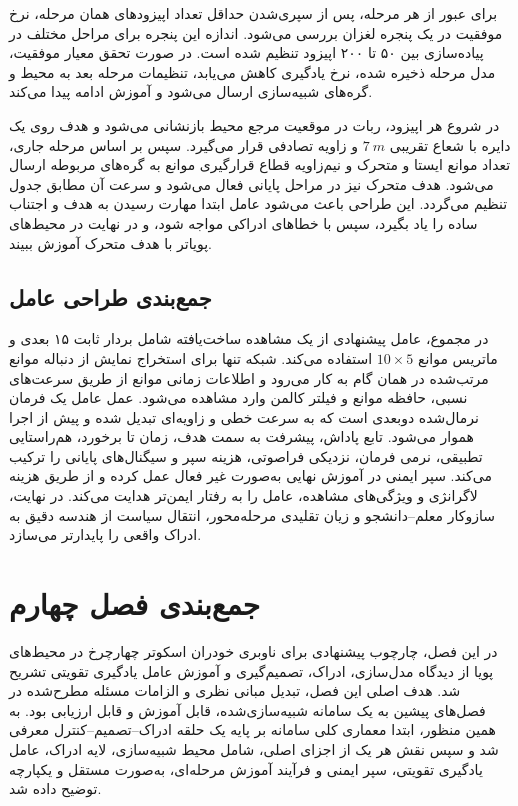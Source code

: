 برای عبور از هر مرحله، پس از سپری‌شدن حداقل تعداد اپیزودهای همان مرحله، نرخ موفقیت در یک پنجره لغزان بررسی می‌شود. اندازه این پنجره برای مراحل مختلف در پیاده‌سازی بین ۵۰ تا ۲۰۰ اپیزود تنظیم شده است. در صورت تحقق معیار موفقیت، مدل مرحله ذخیره شده، نرخ یادگیری کاهش می‌یابد، تنظیمات مرحله بعد به محیط و گره‌های شبیه‌سازی ارسال می‌شود و آموزش ادامه پیدا می‌کند.

در شروع هر اپیزود، ربات در موقعیت مرجع محیط بازنشانی می‌شود و هدف روی یک دایره با شعاع تقریبی \(7~m\) و زاویه تصادفی قرار می‌گیرد. سپس بر اساس مرحله جاری، تعداد موانع ایستا و متحرک و نیم‌زاویه قطاع قرارگیری موانع به گره‌های مربوطه ارسال می‌شود. هدف متحرک نیز در مراحل پایانی فعال می‌شود و سرعت آن مطابق جدول تنظیم می‌گردد. این طراحی باعث می‌شود عامل ابتدا مهارت رسیدن به هدف و اجتناب ساده را یاد بگیرد، سپس با خطاهای ادراکی مواجه شود، و در نهایت در محیط‌های پویاتر با هدف متحرک آموزش ببیند.

\subsection{جمع‌بندی طراحی عامل}
\label{subsec:agent_design_summary_final}

در مجموع، عامل پیشنهادی از یک مشاهده ساخت‌یافته شامل بردار ثابت ۱۵ بعدی و ماتریس موانع \(10\times5\) استفاده می‌کند. شبکه  تنها برای استخراج نمایش از دنباله موانع مرتب‌شده در همان گام به کار می‌رود و اطلاعات زمانی موانع از طریق سرعت‌های نسبی، حافظه موانع و فیلتر کالمن وارد مشاهده می‌شود. عمل عامل یک فرمان نرمال‌شده دوبعدی است که به سرعت خطی و زاویه‌ای تبدیل شده و پیش از اجرا هموار می‌شود. تابع پاداش، پیشرفت به سمت هدف، زمان تا برخورد، هم‌راستایی تطبیقی، نرمی فرمان، نزدیکی فراصوتی، هزینه سپر و سیگنال‌های پایانی را ترکیب می‌کند. سپر ایمنی در آموزش نهایی به‌صورت  غیر فعال عمل کرده و از طریق هزینه لاگرانژی و ویژگی‌های مشاهده، عامل را به رفتار ایمن‌تر هدایت می‌کند. در نهایت، سازوکار معلم--دانشجو و زیان تقلیدی مرحله‌محور، انتقال سیاست از هندسه دقیق به ادراک واقعی را پایدارتر می‌سازد.

\section{جمع‌بندی فصل چهارم}
\label{sec:chapter4_summary}

در این فصل، چارچوب پیشنهادی برای ناوبری خودران اسکوتر چهارچرخ در محیط‌های پویا از دیدگاه مدل‌سازی، ادراک، تصمیم‌گیری و آموزش عامل یادگیری تقویتی تشریح شد. هدف اصلی این فصل، تبدیل مبانی نظری و الزامات مسئله مطرح‌شده در فصل‌های پیشین به یک سامانه شبیه‌سازی‌شده، قابل آموزش و قابل ارزیابی بود. به همین منظور، ابتدا معماری کلی سامانه بر پایه یک حلقه ادراک--تصمیم--کنترل معرفی شد و سپس نقش هر یک از اجزای اصلی، شامل محیط شبیه‌سازی، لایه ادراک، عامل یادگیری تقویتی، سپر ایمنی و فرآیند آموزش مرحله‌ای، به‌صورت مستقل و یکپارچه توضیح داده شد.

